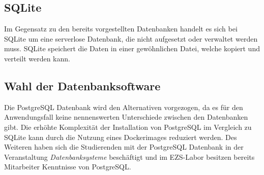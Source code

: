 \subsection{SQLite}
Im Gegensatz zu den bereits vorgestellten Datenbanken handelt es sich bei SQLite um eine serverlose Datenbank, die nicht aufgesetzt oder verwaltet werden muss. SQLite speichert die Daten in einer gewöhnlichen Datei, welche kopiert und verteilt werden kann. \cite{sqliteFeaturesSQLite}

\subsection{Wahl der Datenbanksoftware}
Die PostgreSQL Datenbank wird den Alternativen vorgezogen, da es für den Anwendungsfall keine nennenswerten Unterschiede zwischen den Datenbanken gibt. Die erhöhte Komplexität der Installation von PostgreSQL im Vergleich zu SQLite kann durch die Nutzung eines Dockerimages reduziert werden. Des Weiteren haben sich die Studierenden mit der PostgreSQL Datenbank in der Veranstaltung \textit{Datenbanksysteme} beschäftigt und im EZS-Labor besitzen bereits Mitarbeiter Kenntnisse von PostgreSQL.
